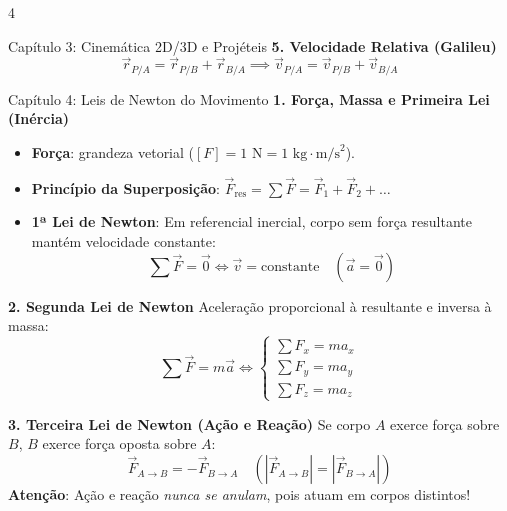 \documentclass[9pt,a4paper,landscape]{extarticle}
\begin{document}
\begin{multicols*}{4}
\begin{topicbox}{Capítulo 3: Cinemática 2D/3D e Projéteis}
\textbf{5. Velocidade Relativa (Galileu)}
\begin{equation*}
    \vec{r}_{P/A} = \vec{r}_{P/B} + \vec{r}_{B/A} \implies \vec{v}_{P/A} = \vec{v}_{P/B} + \vec{v}_{B/A}
\end{equation*}
\end{topicbox}

\begin{topicbox}{Capítulo 4: Leis de Newton do Movimento}
\textbf{1. Força, Massa e Primeira Lei (Inércia)}
\begin{itemize}
    \item \textbf{Força}: grandeza vetorial ($[F] = 1\text{ N} = 1\text{ kg}\cdot\text{m/s}^2$).
    \item \textbf{Princípio da Superposição}: $\vec{F}_{\text{res}} = \sum \vec{F} = \vec{F}_1 + \vec{F}_2 + \dots$
    \item \textbf{1ª Lei de Newton}: Em referencial inercial, corpo sem força resultante mantém velocidade constante:
    \begin{equation*}
        \sum \vec{F} = \vec{0} \iff \vec{v} = \text{constante} \quad (\vec{a} = \vec{0})
    \end{equation*}
\end{itemize}

\textbf{2. Segunda Lei de Newton}
Aceleração proporcional à resultante e inversa à massa:
\begin{equation*}
    \sum \vec{F} = m \vec{a} \iff \begin{cases} \sum F_x = m a_x \\ \sum F_y = m a_y \\ \sum F_z = m a_z \end{cases}
\end{equation*}

\textbf{3. Terceira Lei de Newton (Ação e Reação)}
Se corpo $A$ exerce força sobre $B$, $B$ exerce força oposta sobre $A$:
\begin{equation*}
    \vec{F}_{A \to B} = -\vec{F}_{B \to A} \quad (|\vec{F}_{A \to B}| = |\vec{F}_{B \to A}|)
\end{equation*}
\textbf{Atenção}: Ação e reação \emph{nunca se anulam}, pois atuam em corpos distintos!


\end{topicbox}
\end{multicols*}
\end{document}
